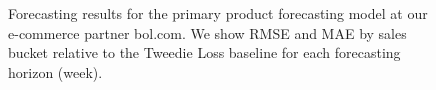 \documentclass[preprint, 3p, times, twocolumn]{elsarticle}
\begin{document}
  \begin{figure}[t] 
     \quad
    \caption{Forecasting results for the primary product forecasting model at our e-commerce partner bol.com. We show RMSE and MAE by sales bucket relative to the Tweedie Loss baseline for each forecasting horizon (week).}
    \label{fig:bol_results}
  \end{figure}
\end{document}

